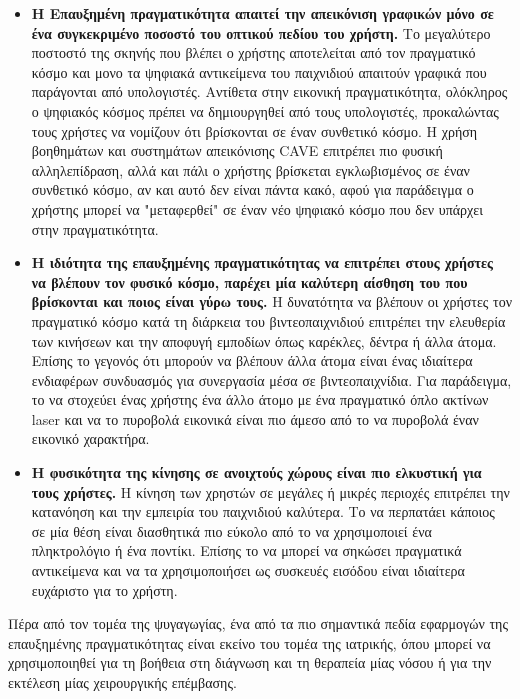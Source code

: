 \begin{itemize}
\item \textbf{Η Επαυξημένη πραγματικότητα απαιτεί την απεικόνιση γραφικών μόνο σε ένα συγκεκριμένο ποσοστό του οπτικού πεδίου του χρήστη.} Το μεγαλύτερο ποστοστό της σκηνής που βλέπει ο χρήστης αποτελείται από τον πραγματικό κόσμο και μονο τα ψηφιακά αντικείμενα του παιχνιδιού απαιτούν γραφικά που παράγονται από υπολογιστές. Αντίθετα στην εικονική πραγματικότητα, ολόκληρος ο ψηφιακός κόσμος πρέπει να δημιουργηθεί από τους υπολογιστές, προκαλώντας τους χρήστες να νομίζουν ότι βρίσκονται σε έναν συνθετικό κόσμο. Η χρήση βοηθημάτων και συστημάτων απεικόνισης CAVE επιτρέπει πιο φυσική αλληλεπίδραση, αλλά και πάλι ο χρήστης βρίσκεται εγκλωβισμένος σε έναν συνθετικό κόσμο, αν και αυτό δεν είναι πάντα κακό, αφού για παράδειγμα ο χρήστης μπορεί να "μεταφερθεί" σε έναν νέο ψηφιακό κόσμο που δεν υπάρχει στην πραγματικότητα.
  
\item \textbf{Η ιδιότητα της επαυξημένης πραγματικότητας να επιτρέπει στους χρήστες να βλέπουν τον φυσικό κόσμο, παρέχει μία καλύτερη αίσθηση του που βρίσκονται και ποιος είναι γύρω τους.} H δυνατότητα να βλέπουν οι χρήστες τον πραγματικό κόσμο κατά τη διάρκεια του βιντεοπαιχνιδιού επιτρέπει την ελευθερία των κινήσεων και την αποφυγή εμποδίων όπως καρέκλες, δέντρα ή άλλα άτομα. Επίσης το γεγονός ότι μπορούν να βλέπουν άλλα άτομα είναι ένας ιδιαίτερα ενδιαφέρων συνδυασμός για συνεργασία μέσα σε βιντεοπαιχνίδια. Για παράδειγμα, το να στοχεύει ένας χρήστης ένα άλλο άτομο με ένα πραγματικό όπλο ακτίνων laser και να το πυροβολά εικονικά είναι πιο άμεσο από το να πυροβολά έναν εικονικό χαρακτήρα. 
  
\item \textbf{Η φυσικότητα της κίνησης σε ανοιχτούς χώρους είναι πιο ελκυστική για τους χρήστες.} Η κίνηση των χρηστών σε μεγάλες ή μικρές περιοχές επιτρέπει την κατανόηση και την εμπειρία του παιχνιδιού καλύτερα. Το να περπατάει κάποιος σε μία θέση είναι διασθητικά πιο εύκολο από το να χρησιμοποιεί ένα πληκτρολόγιο ή ένα ποντίκι. Επίσης το να μπορεί να σηκώσει πραγματικά αντικείμενα και να τα χρησιμοποιήσει ως συσκευές εισόδου είναι ιδιαίτερα ευχάριστο για το χρήστη.
\end{itemize}

  



Πέρα από τον τομέα της ψυγαγωγίας, ένα από τα πιο σημαντικά πεδία εφαρμογών της επαυξημένης πραγματικότητας είναι εκείνο του τομέα της ιατρικής, όπου  μπορεί να χρησιμοποιηθεί για τη βοήθεια στη διάγνωση και τη θεραπεία μίας νόσου ή για την εκτέλεση μίας χειρουργικής επέμβασης. 


